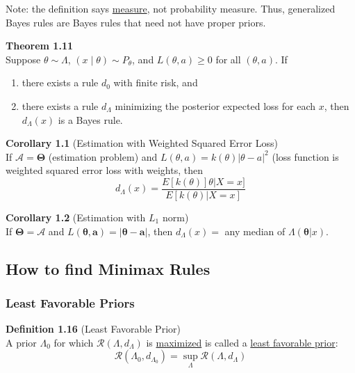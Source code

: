 \documentclass[12pt]{article}
\numberwithin{equation}{section}
\begin{document}
Note: the definition says \underline{measure}, not probability measure. Thus, generalized Bayes rules are Bayes rules that need not have proper priors. 

\textbf{Theorem 1.11} \\
Suppose $\theta \sim \Lambda$, $(x \mid \theta) \sim P_{\theta}$, and $L(\theta, a) \ge 0$ for all $(\theta, a)$. If
\begin{enumerate}
  \item there exists a rule $d_0$ with finite risk, and
  \item there exists a rule $d_{\Lambda}$ minimizing the posterior expected loss for each $x$, then $d_{\Lambda}(x)$ is a Bayes rule.
\end{enumerate}

\textbf{Corollary 1.1} (Estimation with Weighted Squared Error Loss) \\
If $\mathbf{\mathcal{A}} = \mathbf{\Theta}$ (estimation problem) and 
$L(\theta, a) = k(\theta)|\theta - a|^2$ (loss function is weighted squared error loss with weights, then
\begin{equation*}
  d_{\Lambda}(x) = \frac{E[k(\theta)] \theta | X = x]}{E[k(\theta) | X = x]}
\end{equation*}

\textbf{Corollary 1.2} (Estimation with $L_1$ norm) \\
If $\mathbf{\Theta} = \mathbf{\mathcal{A}}$ and $L(\mathbf{\theta, a}) = |\mathbf{\theta} - \mathbf{a}|$, then $d_{\Lambda}(x) = $ any median of $\Lambda(\mathbf{\theta} | x)$. 

\subsection{How to find Minimax Rules}

\subsubsection{Least Favorable Priors}

\textbf{Definition 1.16} (Least Favorable Prior) \\
A prior $\Lambda_0$ for which $\mathcal{R}(\Lambda, d_{\Lambda})$ is \underline{maximized} is called a \underline{least favorable prior}:
\begin{equation*}
  \mathcal{R}(\Lambda_0, d_{\Lambda_0}) = 
    \sup_{\Lambda} \mathcal{R}(\Lambda, d_{\Lambda})
\end{equation*}
\end{document}
